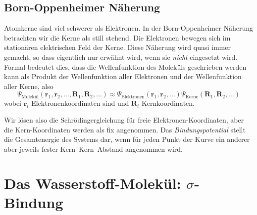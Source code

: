 \subsection{Born-Oppenheimer Näherung}

Atomkerne sind viel schwerer als Elektronen. In der Born-Oppenheimer Näherung betrachten wir die Kerne als still stehend. Die Elektronen bewegen sich im stationären elektrischen Feld der Kerne. Diese Näherung wird quasi immer gemacht, so dass eigentlich nur erwähnt wird, wenn sie \emph{nicht} eingesetzt wird. Formal bedeutet dies, dass die Wellenfunktion des Moleküls geschrieben werden kann als Produkt der Wellenfunktion aller Elektronen und der Wellenfunktion aller Kerne, also
\begin{equation}
\Psi_{\text{Molekül}}(\mathbf{r}_1, \mathbf{r}_2, \dots, \mathbf{R}_1, \mathbf{R}_2, \dots)
  \approx
  \Psi_{\text{Elektronen}}(\mathbf{r}_1, \mathbf{r}_2, \dots )
\Psi_{\text{Kerne}}( \mathbf{R}_1, \mathbf{R}_2, \dots)
\end{equation}
wobei $\mathbf{r}_i$ Elektronenkoordinaten sind und $\mathbf{R}_i$ Kernkoordinaten.


Wir lösen also die Schrödingergleichung für freie Elektronen-Koordinaten, aber die Kern-Koordinaten werden als fix angenommen. Das \emph{Bindungspotential} stellt die Gesamtenergie des Systems dar, wenn für jeden Punkt der Kurve ein anderer aber jeweils fester Kern--Kern--Abstand angenommen wird.

\section{Das Wasserstoff-Molekül: $\sigma$-Bindung}


